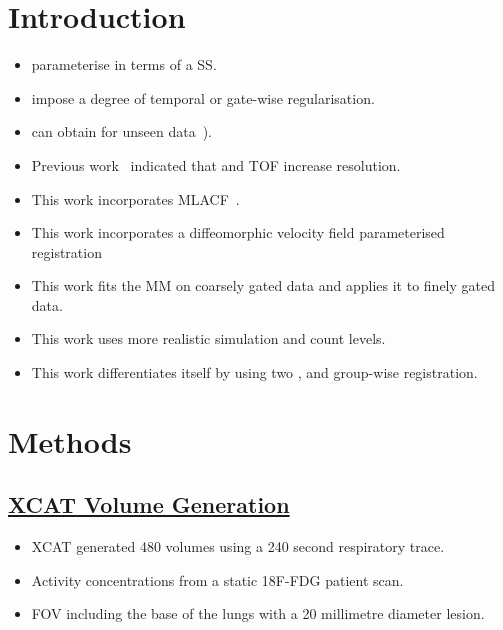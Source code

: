 \documentclass[portrait, color=UCLburgundy, margin=1cm]{uclposter}
\begin{document}
    \begin{multicols}{3}
        \section*{Introduction}
            \begin{highlightbox}[UCLlightgreen]
                \begin{itemize}
                    \item {} parameterise  in terms of a \gls{SS}.
                    \item {} impose a degree of temporal or gate-wise regularisation.
                    \item {} can obtain  for unseen data~\cite{McClelland2013}).
                    \item Previous work~\cite{Whitehead2021ComparisonMap} indicated that  and \gls{TOF} increase resolution.
                    \item This work incorporates \acrshort{MLACF}~\cite{Nuyts2012ML-reconstructionFactors}.
                    \item This work incorporates a diffeomorphic velocity field parameterised registration
                    \item This work fits the \gls{MM} on coarsely gated data and applies it to finely gated data.
                    \item This work uses more realistic simulation and count levels.
                    \item This work differentiates itself by using two , and group-wise registration.
                \end{itemize}
            \end{highlightbox}
        
        \section*{Methods}
            \subsection*{\underline{\textbf{\acrshort{XCAT} Volume Generation}}}
                \begin{itemize}
                    \item \acrshort{XCAT} generated 480 volumes using a 240 second respiratory trace.
                    \item Activity concentrations from a static \gls{18F-FDG} patient scan.
                    \item \gls{FOV} including the base of the lungs with a 20 millimetre diameter lesion.
                \end{itemize}
            

\end{multicols}
\end{document}
